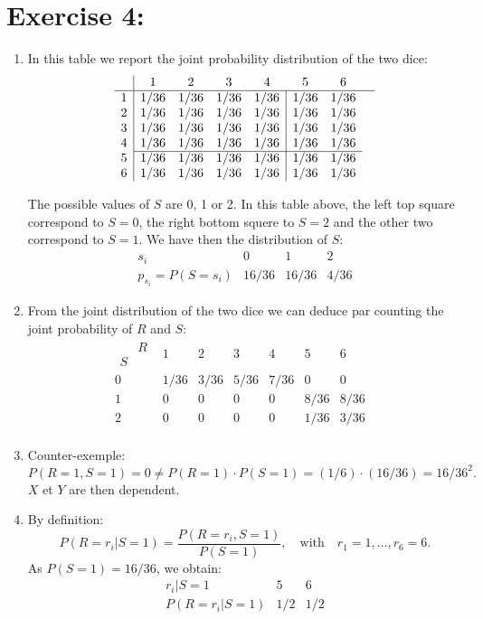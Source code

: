 \documentclass[12pt,thmsa]{article}
\begin{document}
\section*{Exercise 4:}
\begin{enumerate}%
\item In this table we report the joint probability distribution of the two dice:
$$
\begin{array}{c|ccccccc}
 & 1 & 2 & 3 & 4 & 5 & 6 & \\
\hline
1 & 1/36 & 1/36 & 1/36 & \multicolumn{1}{c|}{1/36} & 1/36 & 1/36 \\
2 & 1/36 & 1/36 & 1/36 & \multicolumn{1}{c|}{1/36} & 1/36 & 1/36 \\
3 & 1/36 & 1/36 & 1/36 & \multicolumn{1}{c|}{1/36} & 1/36 & 1/36 \\
4 & 1/36 & 1/36 & 1/36 & \multicolumn{1}{c|}{1/36} & 1/36 & 1/36 \\
\cline{2-7}
5 & 1/36 & 1/36 & 1/36 & \multicolumn{1}{c|}{1/36} & 1/36 & 1/36 \\
6 & 1/36 & 1/36 & 1/36 & \multicolumn{1}{c|}{1/36} & 1/36 & 1/36 \\
\end{array}
$$

The possible values of $S$ are 0, 1 or 2. In this table above, the left top square correspond to $S=0$, the right bottom squere to $S=2$ and the other two correspond to $S=1$.
We have then the distribution of $S$:
$$
\begin{array}{c|ccc}
s_i & 0 & 1 & 2\\
\hline
p_{s_i}  = P(S=s_i) & 16/36 & 16/36 & 4/36
\end{array}
$$

\item From the joint distribution of the two dice we can deduce par counting the joint probability of $R$ and $S$:
$$
\begin{array}{c|ccccccc}
\begin{array}{cc}
&R\\
S&
\end{array} & 1 & 2 & 3 & 4 & 5 & 6 & \\
\hline
0 & 1/36 & 3/36 & 5/36 & 7/36 & 0 & 0 \\
1 & 0 & 0 & 0 & 0 & 8/36 & 8/36 \\
2 & 0 & 0 & 0 & 0 & 1/36 & 3/36 \\
\end{array}
$$
\smallskip

\item Counter-exemple: $P(R=1, S=1) = 0 \neq P(R=1)\cdot P(S=1) = (1/6)\cdot(16/36)=16/36^2.$
$X$ et $Y$ are then dependent.
\smallskip

\item By definition:
$$
P(R=r_i | S=1) = \frac{P(R=r_i, S=1)}{P(S=1)}, \quad \mbox{with}\quad r_1=1,\ldots,r_6=6.
$$
As $P(S=1) = 16/36$, we obtain:
$$
\begin{array}{c|ccc}
r_i|S=1 & 5 & 6\\
\hline
P(R=r_i|S=1) & 1/2 & 1/2
\end{array}
$$
\end{enumerate}
\end{document}

